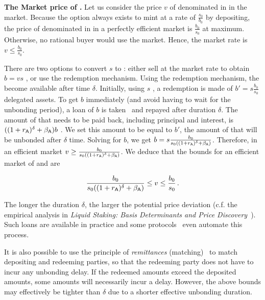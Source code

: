 \noindent
\textbf{The Market price of \stasset.}\label{sec:stasset-price}
Let us consider the price $v$ of \stasset denominated in \asset in the market.
Because the option always exists to mint at a rate of $\frac{s_0}{b_0}$ by
depositing, the price of \stasset denominated in \asset in a perfectly
efficient market is $\frac{b_0}{s_0}$ at maximum. Otherwise, no
rational buyer would use the market. Hence, the market rate is
$v \leq \frac{b_0}{s_0}$.

There are two options to convert $s$ \stasset to \asset: either sell
at the market rate to obtain $b = v s$ \asset, or use the redemption mechanism.
Using the redemption mechanism, the \assets become available after
time $\delta$.
Initially, using $s$ \stasset, a redemption is made of $b' = s \frac{b_0}{s_0}$
delegated assets. To get $b$ \asset immediately (and avoid having to wait
for the unbonding period), a loan of $b$ \asset is taken~\cite[p.~13]{liquid-staking-report} and
repayed after duration $\delta$.
The amount of \asset that needs to be paid back,
including principal and interest, is $((1 + r_{\textsf{A}})^\delta + \beta_{\textsf{A}})b$ \asset.
We set this amount to be equal to $b'$, the amount of \assets that will be
unbonded after $\delta$ time. Solving for $b$, we get
$b = s \frac{b_0}{s_0 ((1 + r_{\textsf{A}})^\delta + \beta_{\textsf{A}})}$.
Therefore, in an efficient market $v \geq \frac{b_0}{s_0 ((1 + r_{\textsf{A}})^\delta + \beta_{\textsf{A}})}$.
We deduce that the bounds for an efficient market of \asset and \stasset are

\[
  \frac{b_0}{s_0 ((1 + r_{\textsf{A}})^\delta + \beta_{\textsf{A}})} \leq v \leq \frac{b_0}{s_0}\,.
\]

The longer the duration $\delta$, the larger the potential price deviation
(c.f. the empirical analysis in
\emph{Liquid Staking: Basis Determinants and Price Discovery}~\cite{scharnowski2022liquid}).
Such loans are available in practice and some
protocols~\cite[\S5]{parallel}\cite{marinade-matching} even automate this process.

It is also possible to use the principle of \emph{remittances}
(matching)~\cite[\S5]{parallel}\cite{marinade-matching} to match depositing and
redeeming parties, so that the redeeming party does not have to incur any unbonding delay.
If the redeemed amounts exceed the deposited amounts, some amounts will necessarily incur
a delay. However, the above bounds may effectively be tighter than $\delta$ due to
a shorter effective unbonding duration.

